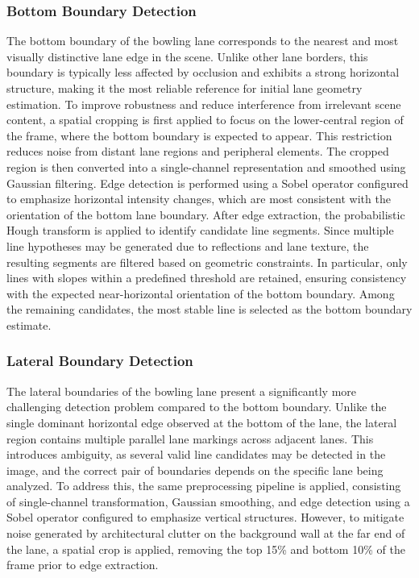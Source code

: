 \subsubsection{Bottom Boundary Detection}
The bottom boundary of the bowling lane corresponds to the nearest and most visually distinctive lane edge in the scene. Unlike other lane borders, this boundary is typically less affected by occlusion and exhibits a strong horizontal structure, making it the most reliable reference for initial lane geometry estimation.
To improve robustness and reduce interference from irrelevant scene content, a spatial cropping is first applied to focus on the lower-central region of the frame, where the bottom boundary is expected to appear. This restriction reduces noise from distant lane regions and peripheral elements.
The cropped region is then converted into a single-channel representation and smoothed using Gaussian filtering. Edge detection is performed using a Sobel operator configured to emphasize horizontal intensity changes, which are most consistent with the orientation of the bottom lane boundary.
After edge extraction, the probabilistic Hough transform is applied to identify candidate line segments. Since multiple line hypotheses may be generated due to reflections and lane texture, the resulting segments are filtered based on geometric constraints. In particular, only lines with slopes within a predefined threshold are retained, ensuring consistency with the expected near-horizontal orientation of the bottom boundary.
Among the remaining candidates, the most stable line is selected as the bottom boundary estimate. 

\subsubsection{Lateral Boundary Detection}
The lateral boundaries of the bowling lane present a significantly more challenging detection problem compared to the bottom boundary. Unlike the single dominant horizontal edge observed at the bottom of the lane, the lateral region contains multiple parallel lane markings across adjacent lanes. This introduces ambiguity, as several valid line candidates may be detected in the image, and the correct pair of boundaries depends on the specific lane being analyzed.
To address this, the same preprocessing pipeline is applied, consisting of single-channel transformation, Gaussian smoothing, and edge detection using a Sobel operator configured to emphasize vertical structures. However, to mitigate noise generated by architectural clutter on the background wall at the far end of the lane, a spatial crop is applied, removing the top 15\% and bottom 10\% of the frame prior to edge extraction. 


